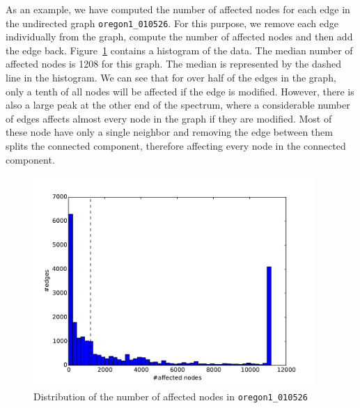 As an example, we have computed the number of affected nodes for each edge in the undirected graph \texttt{oregon1\_010526}. For this purpose, we remove each edge individually from the graph, compute the number of affected nodes and then add the edge back. Figure~\ref{fig:histOregon1} contains a histogram of the data. The median number of affected nodes is 1208 for this graph. The median is represented by the dashed line in the histogram. We can see that for over half of the edges in the graph, only a tenth of all nodes will be affected if the edge is modified. However, there is also a large peak at the other end of the spectrum, where a considerable number of edges affects almost every node in the graph if they are modified. Most of these node have only a single neighbor and removing the edge between them splits the connected component, therefore affecting every node in the connected component.

\begin{figure}[h!]
  \includegraphics[width=0.95\textwidth]{figures/oregon1-affected}
  \caption{Distribution of the number of affected nodes in \texttt{oregon1\_010526}}
  \label{fig:histOregon1}
\end{figure}

